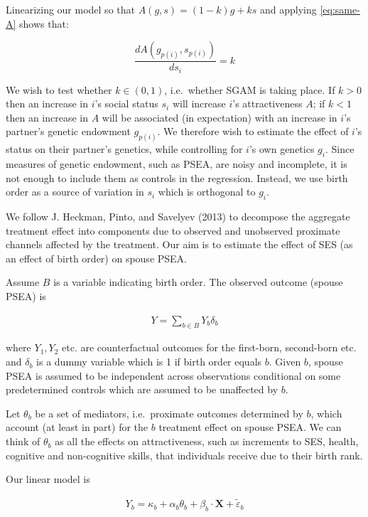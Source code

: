 \documentclass[
]{article}
\begin{document}
Linearizing our model so that \(A(g, s) = (1-k)g + ks\) and applying
\eqref{eq:same-A} shows that:

\[
\frac{d A(g_{p(i)}, s_{p(i)})}{d s_i} = k
\]

We wish to test whether \(k \in (0, 1)\), i.e.~whether SGAM is taking
place. If \(k > 0\) then an increase in \(i\)'s social status \(s_i\) will
increase \(i\)'s attractiveness \(A\); if \(k < 1\) then an increase in \(A\)
will be associated (in expectation) with an increase in \(i\)'s partner's
genetic endowment \(g_{p(i)}\). We therefore wish to estimate the effect
of \(i\)'s status on their partner's genetics, while controlling for \(i\)'s
own genetics \(g_i\). Since measures of genetic endowment, such as PSEA,
are noisy and incomplete, it is not enough to include them as controls in the
regression. Instead, we use birth order as a source of variation in
\(s_i\) which is orthogonal to \(g_i\).

We follow J. Heckman, Pinto, and Savelyev (2013) to decompose the aggregate treatment
effect into components due to observed and unobserved proximate channels
affected by the treatment. Our aim is to estimate the effect of SES (as
an effect of birth order) on spouse PSEA.

Assume \(B\) is a variable indicating birth order. The observed outcome
(spouse PSEA) is

\begin{align}
\label{eq:Y}
Y = \sum_{b \in B}Y_b\delta_b
\end{align}

where \(Y_1, Y_2\) etc. are counterfactual outcomes for the first-born,
second-born etc. and \(\delta_b\) is a dummy variable which is 1 if birth
order equals \(b\). Given \(b\), spouse PSEA is assumed to be independent
across observations conditional on some predetermined controls which are
assumed to be unaffected by \(b\).

Let \(\theta_b\) be a set of mediators, i.e.~proximate outcomes determined
by \(b\), which account (at least in part) for the \(b\) treatment effect on
spouse PSEA. We can think of \(\theta_b\) as all the effects on
attractiveness, such as increments to SES, health, cognitive and
non-cognitive skills, that individuals receive due to their birth rank.

Our linear model is

\begin{align}
\label{eq:Yb}
Y_b = \kappa_b + \alpha_b\theta_b + \beta_b \cdot \mathbf{X} + \tilde{\varepsilon}_b
\end{align}
\end{document}
